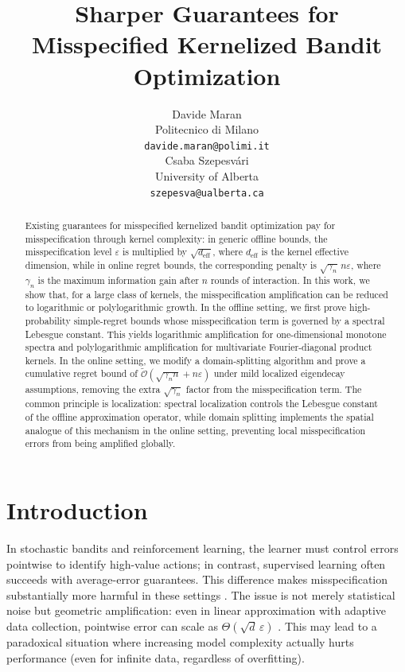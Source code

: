 \documentclass{article}
\title{Sharper Guarantees for Misspecified Kernelized Bandit Optimization}
\author{%
  Davide Maran \\
  Politecnico di Milano\\
  \texttt{davide.maran@polimi.it} \\
  \And
  Csaba Szepesv\'ari\\
University of Alberta\\
  \texttt{szepesva@ualberta.ca} \\
}
\let\cite\citep
\numberwithin{theorem}{section}
\theoremstyle{definition}
\begin{document}
\maketitle


\begin{abstract}
Existing guarantees for misspecified kernelized bandit optimization pay for misspecification through kernel complexity: 
in generic offline bounds, the misspecification level $\varepsilon$ is multiplied by $\sqrt{d_\mathrm{eff}}$, where $d_\mathrm{eff}$ is the kernel effective dimension, while in online regret bounds, the corresponding penalty is $\sqrt{\gamma_n}\,n\varepsilon$, where $\gamma_n$ is the maximum information gain after $n$ rounds of interaction.
 In this work, we show that, for a large class of kernels, the misspecification amplification can be reduced to logarithmic or polylogarithmic growth. 
In the offline setting, we first prove high-probability simple-regret bounds whose misspecification term is governed by a spectral Lebesgue constant. 
This yields logarithmic amplification for one-dimensional monotone spectra and polylogarithmic amplification for multivariate Fourier-diagonal product kernels. 
In the online setting, we modify a domain-splitting algorithm and prove a cumulative regret bound of $\widetilde{\mathcal O}(\sqrt{\gamma_n n}+n\varepsilon)$ under mild localized eigendecay assumptions, removing the extra $\sqrt{\gamma_n}$ factor from the misspecification term. 
The common principle is localization: spectral localization controls the Lebesgue constant of the offline approximation operator, while domain splitting implements the spatial analogue of this mechanism in the online setting, preventing local misspecification errors from being amplified globally.
\end{abstract}

\section{Introduction}

In stochastic bandits and reinforcement learning, the learner must control errors pointwise to identify high-value actions; in contrast, supervised learning often succeeds with average-error guarantees. This difference makes misspecification substantially more harmful in these settings \cite{lattimore2020bandit}. The issue is not merely statistical noise but geometric amplification: even in linear approximation with adaptive data collection, pointwise error can scale as $\Theta(\sqrt d\,\varepsilon)$ \cite{du2020good,lattimore2020learning}. This may lead to a paradoxical situation where increasing model complexity actually hurts performance (even for infinite data, regardless of overfitting).
\end{document}
